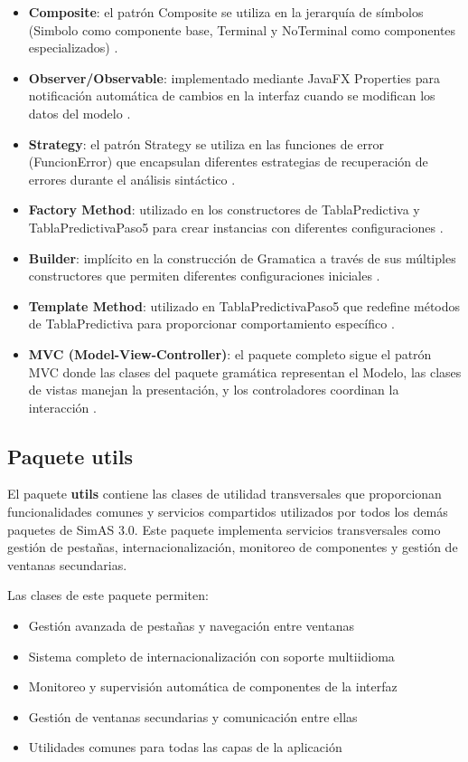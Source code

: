 \begin{itemize}
    \item \textbf{Composite}: el patrón Composite se utiliza en la jerarquía de símbolos (Simbolo como componente base, Terminal y NoTerminal como componentes especializados) \cite{gamma1995design}.
    \item \textbf{Observer/Observable}: implementado mediante JavaFX Properties para notificación automática de cambios en la interfaz cuando se modifican los datos del modelo \cite{gamma1995design}.
    \item \textbf{Strategy}: el patrón Strategy se utiliza en las funciones de error (FuncionError) que encapsulan diferentes estrategias de recuperación de errores durante el análisis sintáctico \cite{gamma1995design}.
    \item \textbf{Factory Method}: utilizado en los constructores de TablaPredictiva y TablaPredictivaPaso5 para crear instancias con diferentes configuraciones \cite{gamma1995design}.
    \item \textbf{Builder}: implícito en la construcción de Gramatica a través de sus múltiples constructores que permiten diferentes configuraciones iniciales \cite{gamma1995design}.
    \item \textbf{Template Method}: utilizado en TablaPredictivaPaso5 que redefine métodos de TablaPredictiva para proporcionar comportamiento específico \cite{gamma1995design}.
    \item \textbf{MVC (Model-View-Controller)}: el paquete completo sigue el patrón MVC donde las clases del paquete gramática representan el Modelo, las clases de vistas manejan la presentación, y los controladores coordinan la interacción \cite{burbeck1992applications}.
\end{itemize}

\subsection{Paquete utils}

El paquete \textbf{utils} contiene las clases de utilidad transversales que proporcionan funcionalidades comunes y servicios compartidos utilizados por todos los demás paquetes de SimAS 3.0. Este paquete implementa servicios transversales como gestión de pestañas, internacionalización, monitoreo de componentes y gestión de ventanas secundarias.

Las clases de este paquete permiten:
\begin{itemize}
    \item Gestión avanzada de pestañas y navegación entre ventanas
    \item Sistema completo de internacionalización con soporte multiidioma
    \item Monitoreo y supervisión automática de componentes de la interfaz
    \item Gestión de ventanas secundarias y comunicación entre ellas
    \item Utilidades comunes para todas las capas de la aplicación
\end{itemize}


